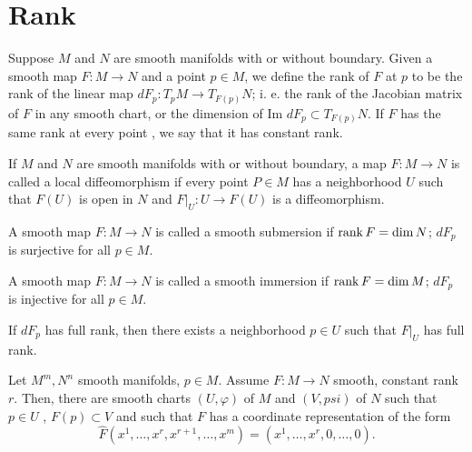 \documentclass[12pt]{scrartcl}
\renewcommand{\hat}{\widehat}
\newcommand\at[2]{\left.#1\right|_{#2}}
\let \phi \varphi
\begin{document}
\section{Rank}
\begin{definition}[Rank] Suppose $M$ and $N$ are smooth manifolds with or without boundary.  Given a smooth map $F: M \to N$ and a point $p \in M$, we define the rank of $F$ at $p$ to be the rank of the linear map $dF_p: T_pM \to T_{F(p)}N$; i. e. the rank of the Jacobian matrix of $F$ in any smooth chart, or the dimension of $\text{Im }dF_p \subset T_{F(p)}N$.  If $F$ has the same rank at every point , we say that it has constant rank.
\end{definition}

\begin{definition} If $M$ and $N$ are smooth manifolds with or without boundary, a map $F: M \to N$ is called a local diffeomorphism if every point $P \in M$ has a neighborhood $U$ such that $F(U)$ is open in $N$ and $\at{F}{U}: U \to F(U)$ is a diffeomorphism.    
\end{definition}

\begin{definition}[Submersion] A smooth map $F:M \to N$ is called a smooth submersion if $\operatorname{rank} F = \dim N$; $dF_p$ is surjective for all $p \in M$.
\end{definition}
\begin{definition}[Immersion] A smooth map $F:M \to N$ is called a smooth immersion if $\operatorname{rank} F = \dim M$; $dF_p$ is injective for all $p \in M$.
\end{definition}

\begin{theorem} If $dF_p$ has full rank, then there exists a neighborhood $p \in U$ such that $\at{F}{U}$ has full rank.
\end{theorem}

\begin{theorem} Let $M^m, N^n$ smooth manifolds, $p \in M$.  Assume $F: M \to N$ smooth, constant rank $r$.  Then, there are smooth charts $(U, \phi)$ of $M$ and $(V, psi)$ of $N$ such that $p \in U$ 
, $F(p) \subset V$ and such that $F$ has a coordinate representation of the form
$$\hat{F}(x^1, \dots, x^r, x^{r+1},\dots, x^m) = (x^1, \dots, x^r, 0, \dots, 0).$$
\end{theorem}
\end{document}
